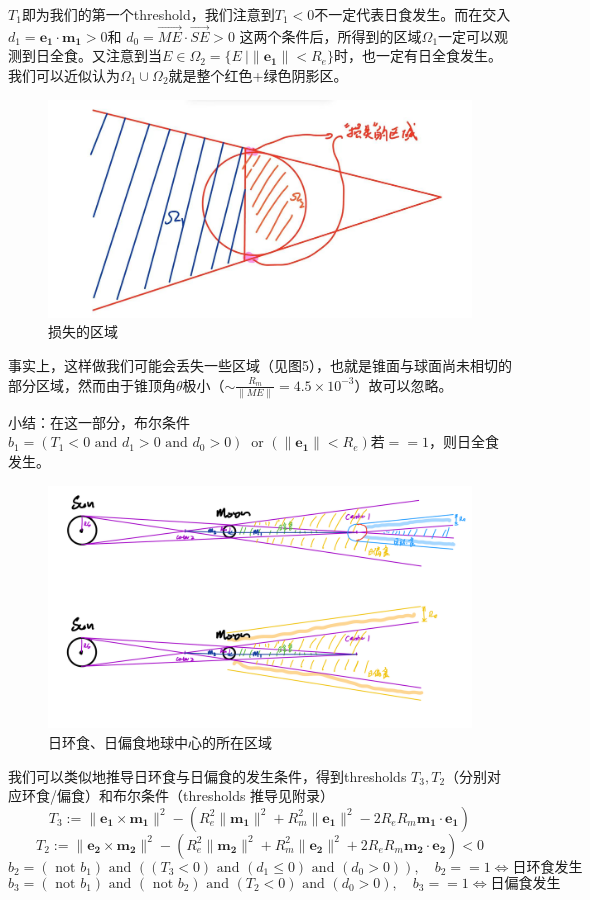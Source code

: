 \documentclass[hidelinks]{article}
\newcommand{\dps}{\displaystyle}
\newcommand{\vt}[1]{\mathbf{#1}}
\newcommand{\norm}[1]{\| #1 \|}
\newcommand{\andd}{\mbox{ and }}
\newcommand{\nott}{\mbox{ not }}
\begin{document}
$T_1$即为我们的第一个threshold，我们注意到$T_1 < 0$不一定代表日食发生。而在交入$d_1 = \vt{e_1} \cdot\vt{m_1} > 0$和
$d_0 = \overrightarrow{ME}\cdot \overrightarrow{SE} >0$
这两个条件后，所得到的区域$\Omega_1$一定可以观测到日全食。又注意到当$E\in \Omega_2 = \{E\ | \norm{\vt{e_1}} < R_e\}$时，也一定有日全食发生。我们可以近似认为$\Omega_1 \cup \Omega_2$就是整个红色+绿色阴影区。

\begin{figure}[H]
    \centering
    \includegraphics[width=0.5\linewidth]{images/lost_regions.jpg}
    \caption{损失的区域}
    \label{fig:enter-label}
\end{figure}
事实上，这样做我们可能会丢失一些区域（见图5），也就是锥面与球面尚未相切的部分区域，然而由于锥顶角$\theta$极小（$\dps\sim \frac{R_m}{\norm{ME}} = 4.5\times10^{-3}$）故可以忽略。

小结：在这一部分，布尔条件$b_1 = (T_1 < 0 \mbox{ and } d_1 > 0 \mbox{ and } d_0 > 0)\ \mbox{ or } (\norm{\vt{e_1}} < R_e)$若$==1$，则日全食发生。

\begin{figure}
    \centering
    \includegraphics[width=0.8\linewidth]{images/annular_partial_eclipse.jpg}
    \caption{日环食、日偏食地球中心的所在区域}
    \label{fig:enter-label}
\end{figure}

我们可以类似地推导日环食与日偏食的发生条件，得到thresholds $T_3, T_2$（分别对应环食/偏食）和布尔条件（thresholds 推导见附录）
$$
T_3
 := \norm{\vt{e_1} \times \vt{m_1}}^2 - (R_e^2 \norm{\vt{m_1}}^2 + R_m^2 \norm{\vt{e_1}}^2 - 2R_e R_m \vt{m_1}\cdot \vt{e_1})
$$
$$
T_2 := \norm{\vt{e_2} \times \vt{m_2}}^2 - (R_e^2 \norm{\vt{m_2}}^2 + R_m^2 \norm{\vt{e_2}}^2 + 2R_e R_m \vt{m_2}\cdot \vt{e_2}) < 0
$$
$$
b_2 = (\mbox{ not } b_1) \andd ((T_3 < 0) \andd (d_1 \leq 0) \andd (d_0 > 0)),\quad b_2 == 1 \Longleftrightarrow \text{日环食发生}
$$ $$
b_3 = (\nott b_1) \andd (\nott b_2) \andd (T_2 < 0) \andd (d_0 > 0), \quad b_3 == 1 \Longleftrightarrow \text{日偏食发生}
$$
\end{document}
